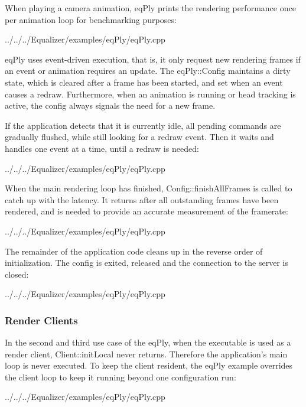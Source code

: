 \documentclass[10pt,a4]{scrartcl}
\begin{document}
When playing a camera animation, \textsf{eqPly} prints the rendering performance
once per animation loop for benchmarking purposes:

{\footnotesize
  {../../../Equalizer/examples/eqPly/eqPly.cpp}}

\textsf{eqPly} uses event-driven execution, that is, it only request new
rendering frames if an event or animation requires an update. The
\textsf{eqPly::Config} maintains a dirty state, which is cleared after a
frame has been started, and set when an event causes a
redraw. Furthermore, when an animation is running or head tracking is
active, the config always signals the need for a new frame.

If the application detects that it is currently idle, all pending
commands are gradually flushed, while still looking for a redraw
event. Then it waits and handles one event at a time, until a redraw is
needed:

{\footnotesize
  {../../../Equalizer/examples/eqPly/eqPly.cpp}}

When the main rendering loop has finished,
\textsf{Config::finishAllFrames} is called to catch up with the
latency. It returns after all outstanding frames have been rendered, and
is needed to provide an accurate measurement of the framerate:

{\footnotesize
  {../../../Equalizer/examples/eqPly/eqPly.cpp}}

The remainder of the application code cleans up in the reverse order of
initialization. The config is exited, released and the connection to the server
is closed:

{\footnotesize
  {../../../Equalizer/examples/eqPly/eqPly.cpp}}

\subsubsection{Render Clients}

In the second and third use case of the \textsf{eqPly}, when the
executable is used as a render client, \textsf{Client::initLocal} never
returns. Therefore the application's main loop is never executed. To
keep the client resident, the \textsf{eqPly} example overrides the
client loop to keep it running beyond one configuration run:

{\footnotesize
  {../../../Equalizer/examples/eqPly/eqPly.cpp}}
\end{document}
